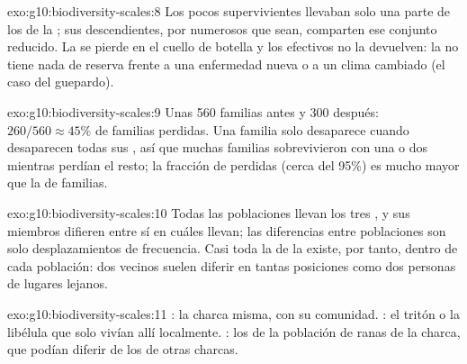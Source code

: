 \begin{solution}{exo:g10:biodiversity-scales:8}
Los pocos supervivientes llevaban solo una parte de los  de la
; sus descendientes, por numerosos que sean, comparten ese
conjunto reducido. La  se pierde en el cuello de
botella y los efectivos no la devuelven: la  no tiene nada de
reserva frente a una enfermedad nueva o a un clima cambiado (el caso
del guepardo).
\end{solution}

\begin{solution}{exo:g10:biodiversity-scales:9}
Unas 560 familias antes y 300 después: $260/560 \approx 45\%$ de
familias perdidas. Una familia solo desaparece cuando desaparecen todas
sus , así que muchas familias sobrevivieron con una o dos
 mientras perdían el resto; la fracción de  perdidas
(cerca del 95\%) es mucho mayor que la de familias.
\end{solution}

\begin{solution}{exo:g10:biodiversity-scales:10}
Todas las poblaciones llevan los tres , y sus miembros difieren
entre sí en cuáles llevan; las diferencias entre poblaciones son solo
desplazamientos de frecuencia. Casi toda la  de la
 existe, por tanto, dentro de cada población: dos vecinos suelen
diferir en tantas posiciones como dos personas de lugares lejanos.
\end{solution}

\begin{solution}{exo:g10:biodiversity-scales:11}
: la charca misma, con su comunidad. : el tritón o la
libélula que solo vivían allí localmente. : los  de la
población de ranas de la charca, que podían diferir de los de otras
charcas.
\end{solution}

